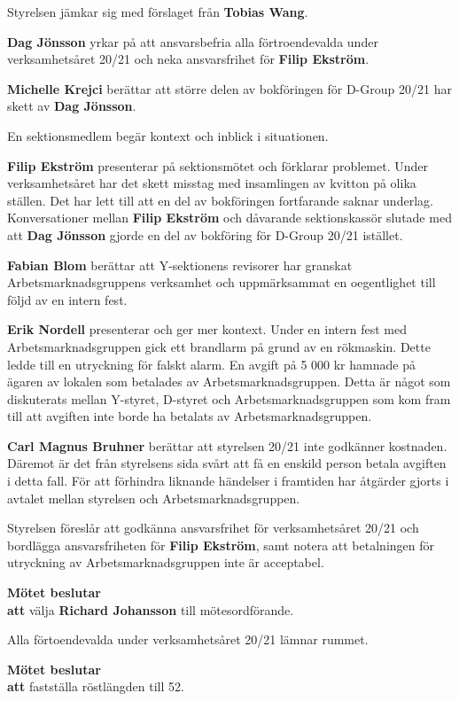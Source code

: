 \documentclass{datateknologsektionen-document}
\newcommand{\ind}{\hspace*{2em}}
\newcommand{\motetbeslutar}{\textbf{Mötet beslutar}}
\newcommand{\att}{\\\ind\textbf{att}}
\begin{document}
Styrelsen jämkar sig med förslaget från \textbf{Tobias Wang}.

\textbf{Dag Jönsson} yrkar på att ansvarsbefria alla förtroendevalda under verksamhetsåret 20/21 och neka ansvarsfrihet för \textbf{Filip Ekström}.

\textbf{Michelle Krejci} berättar att större delen av bokföringen för D-Group 20/21 har skett av \textbf{Dag Jönsson}.

En sektionsmedlem begär kontext och inblick i situationen.

\textbf{Filip Ekström} presenterar på sektionsmötet och förklarar problemet. Under verksamhetsåret har det skett misstag med insamlingen av kvitton på olika ställen. Det har lett till att en del av bokföringen fortfarande saknar underlag. Konversationer mellan \textbf{Filip Ekström} och dåvarande sektionskassör slutade med att \textbf{Dag Jönsson} gjorde en del av bokföring för D-Group 20/21 istället.

\textbf{Fabian Blom} berättar att Y-sektionens revisorer har granskat Arbetsmarknadsgruppens verksamhet och uppmärksammat en oegentlighet till följd av en intern fest.

\textbf{Erik Nordell} presenterar och ger mer kontext. 
Under en intern fest med Arbetsmarknadsgruppen gick ett brandlarm på grund av en rökmaskin. Dette ledde till en utryckning för falskt alarm. En avgift på 5 000 kr hamnade på ägaren av lokalen som betalades av Arbetsmarknadsgruppen. Detta är något som diskuterats mellan Y-styret, D-styret och Arbetsmarknadsgruppen som kom fram till att avgiften inte borde ha betalats av Arbetsmarknadsgruppen.

\textbf{Carl Magnus Bruhner} berättar att styrelsen 20/21 inte godkänner kostnaden. Däremot är det från styrelsens sida svårt att få en enskild person betala avgiften i detta fall. För att förhindra liknande händelser i framtiden har åtgärder gjorts i avtalet mellan styrelsen och Arbetsmarknadsgruppen.

Styrelsen föreslår att godkänna ansvarsfrihet för verksamhetsåret 20/21 och bordlägga ansvarsfriheten för \textbf{Filip Ekström}, samt notera att betalningen för utryckning av Arbetsmarknadsgruppen inte är acceptabel.

\motetbeslutar
\att{} välja \textbf{Richard Johansson} till mötesordförande.

Alla förtoendevalda under verksamhetsåret 20/21 lämnar rummet.

\motetbeslutar
\att{} fastställa röstlängden till 52.
\end{document}
